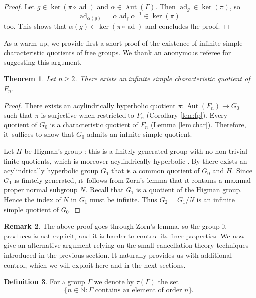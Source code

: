\documentclass[11pt]{article}
\newtheorem{theorem}{Theorem}[section]
\theoremstyle{definition}
\newtheorem{definition}[theorem]{Definition}
\newtheorem{remark}[theorem]{Remark}
\newcommand{\Aut}{\operatorname{Aut}}
\newcommand{\ad}{\operatorname{ad}}
\begin{document}
\begin{proof}
Let $g \in \ker(\pi \circ \ad)$ and $\alpha \in \Aut(\Gamma)$. Then $\ad_g \in \ker(\pi)$, so
\[
\ad_{\alpha(g)} = \alpha \ad_g \alpha^{-1} \in \ker(\pi)
\]
too. This shows that $\alpha(g) \in \ker(\pi \circ \ad)$ and concludes the proof.
\end{proof}

As a warm-up, we provide first a short proof of the existence of infinite simple characteristic quotients of free groups.
We thank an anonymous referee for suggesting this argument.

\begin{theorem}
\label{res: referee statement}
Let $n\geq 2$.
There exists an infinite simple characteristic quotient of~$F_n$.
\end{theorem}

\begin{proof}
There exists an acylindrically hyperbolic quotient $\pi \colon \Aut(F_n) \to G_0$ such that $\pi$ is surjective when restricted to $F_n$ (Corollary \ref{lem:fp}). Every quotient of $G_0$ is a characteristic quotient of $F_n$ (Lemma \ref{lem:char}). Therefore, it~suffices to show that $G_0$ admits an infinite simple quotient.

Let $H$ be Higman's group \cite{higman}: this is a finitely generated group with no non-trivial finite quotients, which is moreover acylindrically hyperbolic \cite[Cor.\,4.26]{MO}.
By \cite[Cor.\,1.6]{hull} there exists an acylindrically hyperbolic group $G_1$ that is a common quotient of $G_0$ and $H$.
Since $G_1$ is finitely generated, it~follows from Zorn's lemma that it contains a maximal proper normal subgroup $N$.
Recall that $G_1$ is a quotient of the Higman group.
Hence the index of $N$ in $G_1$ must be infinite.
Thus $G_2 = G_1/N$ is an infinite simple quotient of $G_0$.
\end{proof}

\begin{remark}
The above proof goes through Zorn's lemma, so the group it produces is not explicit, and it is harder to control its finer properties. We now give an alternative argument relying on the small cancellation theory techniques introduced in the previous section. It naturally provides us with additional control, which we will exploit here and in the next sections.
\end{remark}

\begin{definition}
\label{def:tau}
For a group $\Gamma$ we denote by $\tau(\Gamma)$ the set
\[
\{ n \in \mathbb{N} : \Gamma \text{ contains an element of order } n\}.
\]
\end{definition}
\end{document}
